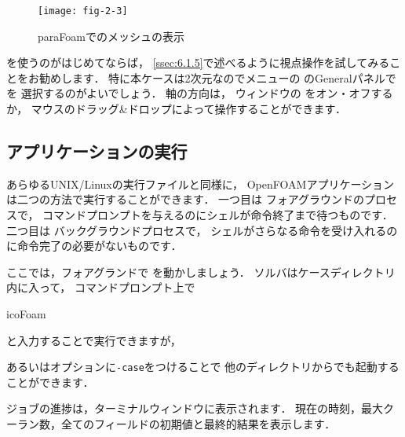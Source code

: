 \begin{figure}[ht]
 \texttt{[image: fig-2-3]}
 \caption{paraFoamでのメッシュの表示}
 \label{fig:2.3}
\end{figure}


を使うのがはじめてならば，
\autoref{ssec:6.1.5}で述べるように視点操作を試してみることをお勧めします．
特に本ケースは2次元なのでメニューの
%
%
のGeneralパネルで
%
%
を
選択するのがよいでしょう．
軸の方向は，
%
%
ウィンドウの
%
%
をオン・オフするか，
マウスのドラッグ\&ドロップによって操作することができます．


\subsection{アプリケーションの実行}
\label{ssec:2.1.3}
あらゆるUNIX/Linuxの実行ファイルと同様に，
OpenFOAMアプリケーションは二つの方法で実行することができます．
一つ目は
%
%
フォアグラウンドのプロセスで，
コマンドプロンプトを与えるのにシェルが命令終了まで待つものです．
二つ目は
%
%
バックグラウンドプロセスで，
シェルがさらなる命令を受け入れるのに命令完了の必要がないものです．

ここでは，フォアグランドで
%
%
を動かしましょう．
ソルバはケースディレクトリ内に入って，
コマンドプロンプト上で
\begin{OFverbatim}[terminal]
icoFoam
\end{OFverbatim}
と入力することで実行できますが，

あるいはオプションに\texttt{-case}をつけることで
他のディレクトリからでも起動することができます．
ジョブの進捗は，ターミナルウィンドウに表示されます．
現在の時刻，最大クーラン数，全てのフィールドの初期値と最終的結果を表示します．


